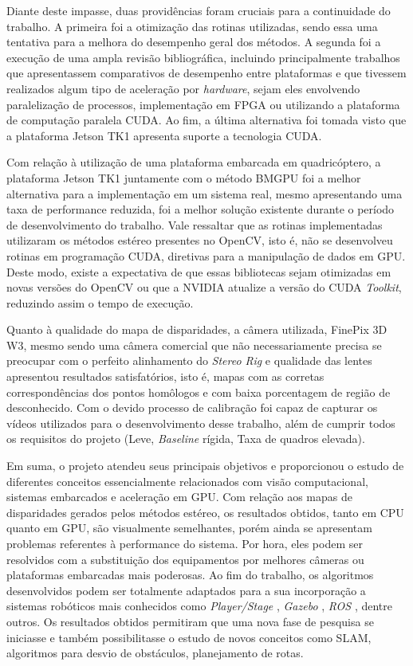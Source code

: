 Diante deste impasse, duas providências foram cruciais para a continuidade do trabalho. A primeira foi a otimização das rotinas utilizadas, sendo essa uma tentativa para a melhora do desempenho geral dos métodos. A segunda foi a execução de uma ampla revisão bibliográfica, incluindo principalmente trabalhos que apresentassem comparativos de desempenho entre plataformas e que tivessem realizados algum tipo de aceleração por \textit{hardware}, sejam eles envolvendo paralelização de processos, implementação em FPGA ou utilizando a plataforma de computação paralela CUDA. Ao fim, a última alternativa foi tomada visto que a plataforma Jetson TK1 apresenta suporte a tecnologia CUDA.

Com relação à utilização de uma plataforma embarcada em quadricóptero, a plataforma Jetson TK1 juntamente com o método BMGPU foi a melhor alternativa para a implementação em um sistema real, mesmo apresentando uma taxa de performance reduzida, foi a melhor solução existente durante o período de desenvolvimento do trabalho. Vale ressaltar que as rotinas implementadas utilizaram os métodos estéreo presentes no OpenCV, isto é, não se desenvolveu rotinas em programação CUDA, diretivas para a manipulação de dados em GPU. Deste modo, existe a expectativa de que essas bibliotecas sejam otimizadas em novas versões do OpenCV ou que a NVIDIA atualize a versão do CUDA \textit{Toolkit}, reduzindo assim o tempo de execução.

Quanto à qualidade do mapa de disparidades, a câmera utilizada, FinePix 3D W3, mesmo sendo uma câmera comercial que não necessariamente precisa se preocupar com o perfeito alinhamento do \textit{Stereo Rig} e qualidade das lentes apresentou resultados satisfatórios, isto é, mapas com as corretas correspondências dos pontos homôlogos e com baixa porcentagem de região de desconhecido. Com o devido processo de calibração foi capaz de capturar os vídeos utilizados para o desenvolvimento desse trabalho, além de cumprir todos os requisitos do projeto (Leve, \textit{Baseline} rígida, Taxa de quadros elevada).

Em suma, o projeto atendeu seus principais objetivos e proporcionou o estudo de diferentes conceitos essencialmente relacionados com visão computacional, sistemas embarcados e aceleração em GPU. Com relação aos mapas de disparidades gerados pelos métodos estéreo, os resultados obtidos, tanto em CPU quanto em GPU, são visualmente semelhantes, porém ainda se apresentam problemas referentes à performance do sistema. Por hora, eles podem ser resolvidos com a substituição dos equipamentos por melhores câmeras ou plataformas embarcadas mais poderosas. Ao fim do trabalho, os algoritmos desenvolvidos podem ser totalmente adaptados para a sua incorporação a sistemas robóticos mais conhecidos como \textit{Player/Stage} \cite{Gerkey2010}, \textit{Gazebo} \cite{Gazebo}, \textit{ROS} \cite{ROS}, dentre outros. Os resultados obtidos permitiram que uma nova fase de pesquisa se iniciasse e também possibilitasse o estudo de novos conceitos como SLAM, algoritmos para desvio de obstáculos, planejamento de rotas.

